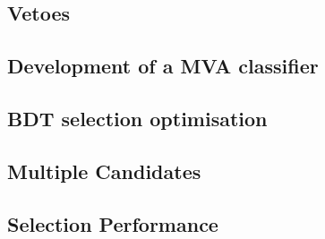 \subsection{Vetoes}
\label{sec:vetoes}


\subsection{Development of a MVA classifier}
\label{sec:MVADev}


\subsection{BDT selection optimisation}
\label{sec:BDTOpt}


\subsection{Multiple Candidates}
\label{sec:MultCands}


\subsection{Selection Performance}
\label{sec:selectionPerformance}
